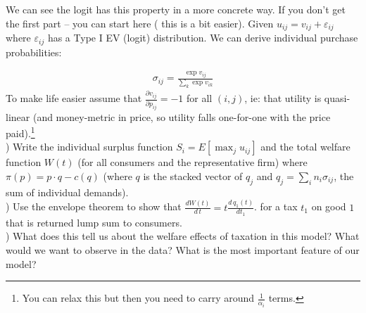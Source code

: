 \documentclass[12pt]{article}
\begin{document}
We can see the logit has this property in a more concrete way. If you don't get the first part -- you can start here ( this is a bit easier). Given $u_{ij} = v_{ij} + \varepsilon_{ij}$ where $\varepsilon_{ij}$ has a Type I EV (logit) distribution. We can derive individual purchase probabilities:

\begin{eqnarray*}
\sigma_{ij} = \frac{\exp v_{ij}}{\sum_k \exp v_{ik}}
\end{eqnarray*}
To make life easier assume that $\frac{\partial v_{ij}}{\partial p_{ij}}=-1$ for all $(i,j)$, ie: that utility is quasi-linear (and money-metric in price, so utility falls one-for-one with the price paid).\footnote{You can relax this but then you need to carry around $\frac{1}{\alpha_i}$ terms.}\\

) Write the individual surplus function $S_i = E[\max_j u_{ij}]$ and the total welfare function $W(t)$ (for all consumers and the representative firm) where $\pi(p) = p \cdot q- c(q)$ (where $q$ is the stacked vector of $q_{j}$ and $q_j = \sum_i n_i \sigma_{ij}$, the sum of individual demands).\\


) Use the envelope theorem to show that $\frac{d W(t)}{d\, t} = t \frac{d\, q_1(t)}{d t_1}$. for a tax $t_1$ on good $1$ that is returned lump sum to consumers.\\

) What does this tell us about the welfare effects of taxation in this model? What would we want to observe in the data? What is the most important feature of our model?
\end{document}
